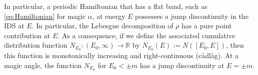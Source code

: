 \documentclass[reqno,12pt,letterpaper]{amsart}
\newcommand{\CC}{{\mathbb C}}
\numberwithin{equation}{section}
\begin{document}
 In particular, a periodic Hamiltonian that has a flat band, such as \eqref{eq:Hamiltonian} for magic $\alpha$, at energy $E$ possesses a jump discontinuity in the IDS at $E$. In particular, the Lebesgue decomposition of $\rho$ has a pure point contribution at $E.$  As a consequence, if we define the associated cumulative distribution function $N_{E_0}: (E_0 ,\infty) \to \mathbb R$ by $N_{E_0}(E):=N([E_0,E])$, then this function is monotonically increasing and right-continuous (càdlàg). At a magic angle, the function $N_{E_0}$ for $E_0<\pm m$ has a jump discontinuity at $E= \pm m.$



\end{document}
